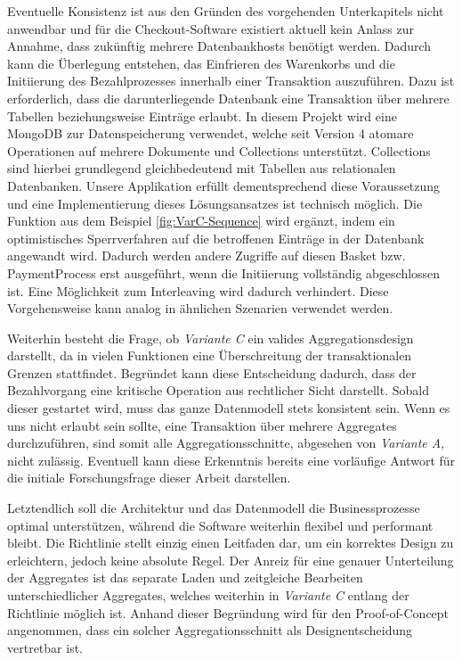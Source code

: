 Eventuelle Konsistenz ist aus den Gründen des vorgehenden Unterkapitels nicht anwendbar und für die Checkout-Software existiert aktuell kein Anlass zur Annahme, dass zukünftig mehrere Datenbankhosts benötigt werden. Dadurch kann die Überlegung entstehen, das Einfrieren des Warenkorbs und die Initiierung des Bezahlprozesses innerhalb einer Transaktion auszuführen. Dazu ist erforderlich, dass die darunterliegende Datenbank eine Transaktion über mehrere Tabellen beziehungsweise Einträge erlaubt. In diesem Projekt wird eine MongoDB zur Datenspeicherung verwendet, welche seit Version 4 atomare Operationen auf mehrere Dokumente und Collections unterstützt. Collections sind hierbei grundlegend gleichbedeutend mit Tabellen aus relationalen Datenbanken. Unsere Applikation erfüllt dementsprechend diese Voraussetzung und eine Implementierung dieses Lösungsansatzes ist technisch möglich. Die Funktion aus dem Beispiel \ref{fig:VarC-Sequence} wird ergänzt, indem ein optimistisches Sperrverfahren auf die betroffenen Einträge in der Datenbank angewandt wird. Dadurch werden andere Zugriffe auf diesen Basket bzw. PaymentProcess erst ausgeführt, wenn die Initiierung vollständig abgeschlossen ist. Eine Möglichkeit zum Interleaving wird dadurch verhindert. Diese Vorgehensweise kann analog in ähnlichen Szenarien verwendet werden.

Weiterhin besteht die Frage, ob \emph{Variante C} ein valides Aggregationsdesign darstellt, da in vielen Funktionen eine Überschreitung der transaktionalen Grenzen stattfindet. Begründet kann diese Entscheidung dadurch, dass der Bezahlvorgang eine kritische Operation aus rechtlicher Sicht darstellt. Sobald dieser gestartet wird, muss das ganze Datenmodell stets konsistent sein. Wenn es uns nicht erlaubt sein sollte, eine Transaktion über mehrere Aggregates durchzuführen, sind somit alle Aggregationsschnitte, abgesehen von \emph{Variante A}, nicht zulässig. Eventuell kann diese Erkenntnis bereits eine vorläufige Antwort für die initiale Forschungsfrage dieser Arbeit darstellen.

Letztendlich soll die Architektur und das Datenmodell die Businessprozesse optimal unterstützen, während die Software weiterhin flexibel und performant bleibt. Die Richtlinie stellt einzig einen Leitfaden dar, um ein korrektes Design zu erleichtern, jedoch keine absolute Regel. Der Anreiz für eine genauer Unterteilung der Aggregates ist das separate Laden und zeitgleiche Bearbeiten unterschiedlicher Aggregates, welches weiterhin in \emph{Variante C} entlang der Richtlinie möglich ist. Anhand dieser Begründung wird für den Proof-of-Concept angenommen, dass ein solcher Aggregationsschnitt als Designentscheidung vertretbar ist. 

